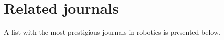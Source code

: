 


\section{Related journals}

A list with the most prestigious journals in robotics is presented below.

